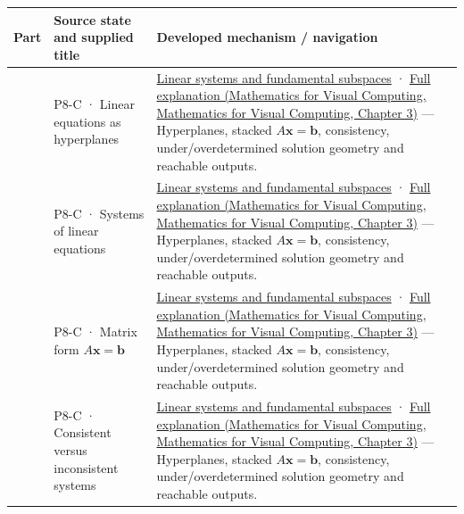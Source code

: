 {\def\LTcaptype{none} %
\begin{longtable}[]{@{}
  >{\raggedright\arraybackslash}p{}
  >{\raggedright\arraybackslash}p{}
  >{\raggedright\arraybackslash}p{}@{}}
\toprule\noalign{}
\begin{minipage}[b]{\linewidth}\raggedright
Part
\end{minipage} & \begin{minipage}[b]{\linewidth}\raggedright
Source state and supplied title
\end{minipage} & \begin{minipage}[b]{\linewidth}\raggedright
Developed mechanism / navigation
\end{minipage} \\
\midrule\noalign{}
\endhead
\bottomrule\noalign{}
\endlastfoot
701 & P8-C · Linear equations as hyperplanes & \hyperref[appendix-8572a4a060c1]{Linear systems and fundamental subspaces} · \href{../02-Mathematics-for-Visual-Computing/main.pdf\#nameddest=01-foundations-i-ch019-a-system-is-an-intersection-of-constraints}{Full explanation (Mathematics for Visual Computing, Mathematics for Visual Computing, Chapter 3)} --- Hyperplanes, stacked \(A\mathbf x=\mathbf b\), consistency, under/overdetermined solution geometry and reachable outputs. \\
702 & P8-C · Systems of linear equations & \hyperref[appendix-8572a4a060c1]{Linear systems and fundamental subspaces} · \href{../02-Mathematics-for-Visual-Computing/main.pdf\#nameddest=01-foundations-i-ch019-a-system-is-an-intersection-of-constraints}{Full explanation (Mathematics for Visual Computing, Mathematics for Visual Computing, Chapter 3)} --- Hyperplanes, stacked \(A\mathbf x=\mathbf b\), consistency, under/overdetermined solution geometry and reachable outputs. \\
703 & P8-C · Matrix form \(A\mathbf x=\mathbf b\) & \hyperref[appendix-8572a4a060c1]{Linear systems and fundamental subspaces} · \href{../02-Mathematics-for-Visual-Computing/main.pdf\#nameddest=01-foundations-i-ch019-a-system-is-an-intersection-of-constraints}{Full explanation (Mathematics for Visual Computing, Mathematics for Visual Computing, Chapter 3)} --- Hyperplanes, stacked \(A\mathbf x=\mathbf b\), consistency, under/overdetermined solution geometry and reachable outputs. \\
704 & P8-C · Consistent versus inconsistent systems & \hyperref[appendix-8572a4a060c1]{Linear systems and fundamental subspaces} · \href{../02-Mathematics-for-Visual-Computing/main.pdf\#nameddest=01-foundations-i-ch019-a-system-is-an-intersection-of-constraints}{Full explanation (Mathematics for Visual Computing, Mathematics for Visual Computing, Chapter 3)} --- Hyperplanes, stacked \(A\mathbf x=\mathbf b\), consistency, under/overdetermined solution geometry and reachable outputs. \\

\end{longtable}}
